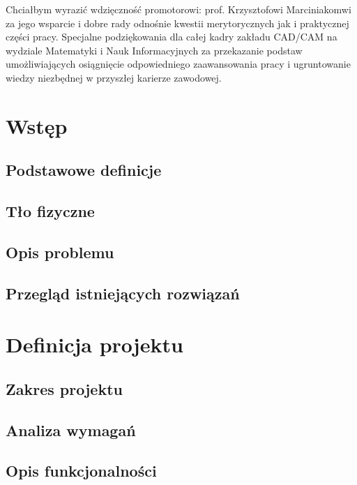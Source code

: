 \documentclass[12pt, oneside]{report}
\theoremstyle{definition}
\begin{document}
Chciałbym wyrazić wdzięczność promotorowi: prof. Krzysztofowi Marciniakomwi za jego wsparcie i dobre rady odnośnie kwestii merytorycznych jak i praktycznej części pracy. Specjalne podziękowania dla całej kadry zakładu CAD/CAM na wydziale Matematyki i Nauk Informacyjnych za przekazanie podstaw umożliwiających osiągnięcie odpowiedniego zaawansowania pracy i ugruntowanie wiedzy niezbędnej w przyszłej karierze zawodowej.

\vspace{\fill}

\newpage
\pagestyle{plain}
\setcounter{page}{5}
\tableofcontents

\newpage
\pagestyle{headings}

\chapter{Wstęp}
\section{Podstawowe definicje}
\section{Tło fizyczne}
\section{Opis problemu}
\section{Przegląd istniejących rozwiązań}


\newpage
\chapter{Definicja projektu}
\section{Zakres projektu}
\section{Analiza wymagań}
\section{Opis funkcjonalności}
\end{document}
